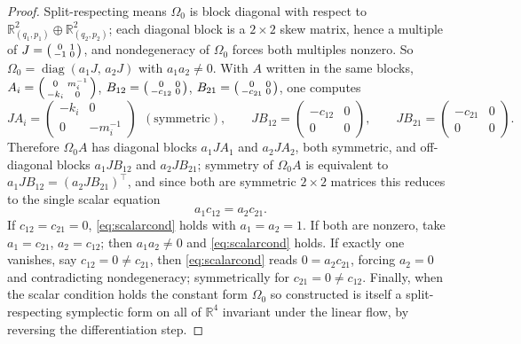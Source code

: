 \documentclass[10pt,a4paper]{article}
\theoremstyle{plain}
\theoremstyle{definition}
\newcommand{\R}{\mathbb{R}}
\begin{document}
\begin{proof}
Split-respecting means $\Omega_0$ is block diagonal with respect to $\R^2_{(q_1,p_1)}\oplus\R^2_{(q_2,p_2)}$; each diagonal block is a $2\times 2$ skew matrix, hence a multiple of $J = \begin{psmallmatrix}0&1\\-1&0\end{psmallmatrix}$, and nondegeneracy of $\Omega_0$ forces both multiples nonzero. So $\Omega_0 = \operatorname{diag}(a_1J,\,a_2J)$ with $a_1a_2 \neq 0$. With $A$ written in the same blocks, $A_i = \begin{psmallmatrix}0&m_i^{-1}\\ -k_i&0\end{psmallmatrix}$, $B_{12} = \begin{psmallmatrix}0&0\\ -c_{12}&0\end{psmallmatrix}$, $B_{21} = \begin{psmallmatrix}0&0\\ -c_{21}&0\end{psmallmatrix}$, one computes
\[
JA_i = \begin{pmatrix}-k_i & 0\\ 0 & -m_i^{-1}\end{pmatrix} \ \ (\text{symmetric}),\qquad
JB_{12} = \begin{pmatrix}-c_{12} & 0\\ 0&0\end{pmatrix},\qquad
JB_{21} = \begin{pmatrix}-c_{21}&0\\0&0\end{pmatrix}.
\]
Therefore $\Omega_0A$ has diagonal blocks $a_1JA_1$ and $a_2JA_2$, both symmetric, and off-diagonal blocks $a_1JB_{12}$ and $a_2JB_{21}$; symmetry of $\Omega_0A$ is equivalent to $a_1JB_{12} = (a_2JB_{21})^{\top}$, and since both are symmetric $2\times2$ matrices this reduces to the single scalar equation
\begin{equation}
\label{eq:scalarcond}
a_1c_{12} = a_2c_{21}.
\end{equation}
If $c_{12} = c_{21} = 0$, \eqref{eq:scalarcond} holds with $a_1 = a_2 = 1$. If both are nonzero, take $a_1 = c_{21}$, $a_2 = c_{12}$; then $a_1a_2 \neq 0$ and \eqref{eq:scalarcond} holds. If exactly one vanishes, say $c_{12} = 0 \neq c_{21}$, then \eqref{eq:scalarcond} reads $0 = a_2c_{21}$, forcing $a_2 = 0$ and contradicting nondegeneracy; symmetrically for $c_{21} = 0 \neq c_{12}$. Finally, when the scalar condition holds the constant form $\Omega_0$ so constructed is itself a split-respecting symplectic form on all of $\R^4$ invariant under the linear flow, by reversing the differentiation step.
\end{proof}
\end{document}
